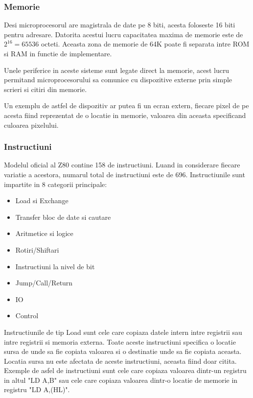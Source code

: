 \documentclass[titlepage,12pt]{article}
\begin{document}
\subsubsection{Memorie}

Desi microprocesorul are magistrala de date pe 8 biti, acesta foloseste 16 biti pentru adresare. Datorita acestui lucru capacitatea maxima de memorie este de \(2^{16}=65536\) octeti. Aceasta zona de memorie de 64K poate fi separata intre \ac {ROM} si \ac {RAM} in functie de implementare.

Unele periferice in aceste sisteme sunt legate direct la memorie, acest lucru permitand microprocesorului sa comunice cu dispozitive externe prin simple scrieri si citiri din memorie.

Un exemplu de astfel de dispozitiv ar putea fi un ecran extern, fiecare pixel de pe acesta fiind reprezentat de o locatie in memorie, valoarea din aceasta specificand culoarea pixelului.

\subsubsection{Instructiuni}

Modelul oficial al \ac {Z80} contine 158 de instructiuni. Luand in considerare fiecare variatie a acestora, numarul total de instructiuni este de 696.
Instructiunile sunt impartite in 8 categorii principale:
\begin{itemize}
    \item Load si Exchange
    \item Transfer bloc de date si cautare
    \item Aritmetice si logice
    \item Rotiri/Shiftari
    \item Instructiuni la nivel de bit
    \item Jump/Call/Return
    \item \ac {IO}
    \item Control
\end{itemize}

Instructiunile de tip Load sunt cele care copiaza datele intern intre registrii sau intre registrii si memoria externa.
Toate aceste instructiuni specifica o locatie sursa de unde sa fie copiata valoarea si o destinatie unde sa fie copiata aceasta.
Locatia sursa nu este afectata de aceste instructiuni, aceasta fiind doar citita.
Exemple de asfel de instructiuni sunt cele care copiaza valoarea dintr-un registru in altul "LD A,B" sau cele care copiaza valoarea dintr-o locatie de memorie in registru "LD A,(HL)".
\end{document}
